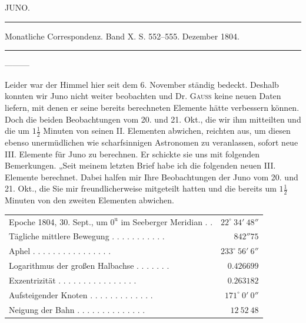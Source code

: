 \clearpage
{}
\hypertarget{native-263-lower}{}
\begin{center}
JUNO.

\rule{0.6\linewidth}{0.4pt}

Monatliche Correspondenz. Band X. S. 552–555. Dezember 1804.

\rule{0.6\linewidth}{0.4pt}
\end{center}

\noindent—\quad—\quad—\par

Leider war der Himmel hier seit dem 6. November ständig bedeckt. Deshalb konnten wir Juno nicht weiter beobachten und Dr. \textsc{Gauss} keine neuen Daten liefern, mit denen er seine bereits berechneten Elemente hätte verbessern können. Doch die beiden Beobachtungen vom 20. und 21. Okt., die wir ihm mitteilten und die um $1\frac{1}{2}$ Minuten von seinen II. Elementen abwichen, reichten aus, um diesen ebenso unermüdlichen wie scharfsinnigen Astronomen zu veranlassen, sofort neue III. Elemente für Juno zu berechnen. Er schickte sie uns mit folgenden Bemerkungen. „Seit meinem letzten Brief habe ich die folgenden neuen III. Elemente berechnet. Dabei halfen mir Ihre Beobachtungen der Juno vom 20. und 21. Okt., die Sie mir freundlicherweise mitgeteilt hatten und die bereits um $1\frac{1}{2}$ Minuten von den zweiten Elementen abwichen.

\begin{center}
\begingroup\fontsize{8}{10}\selectfont\setlength{\tabcolsep}{3pt}\renewcommand{\arraystretch}{1.1}
\begin{tabular}{lr}
Epoche 1804, 30. Sept., um $0^{\mathrm u}$ im Seeberger Meridian . . & $22^\circ\ 34'\ 48''$ \\
Tägliche mittlere Bewegung . . . . . . . . . . . & $842''75$ \\
Aphel . . . . . . . . . . . . . . . . & $233^\circ\ 56'\ 6''$ \\
Logarithmus der großen Halbachse . . . . . . . & $0.426699$ \\
Exzentrizität . . . . . . . . . . . . . . . . & $0.263182$ \\
Aufsteigender Knoten . . . . . . . . . . . . . & $171^\circ\ 0'\ 0''$ \\
Neigung der Bahn . . . . . . . . . . . . . . & $12\ 52\ 48$ \\
\end{tabular}\endgroup
\end{center}

